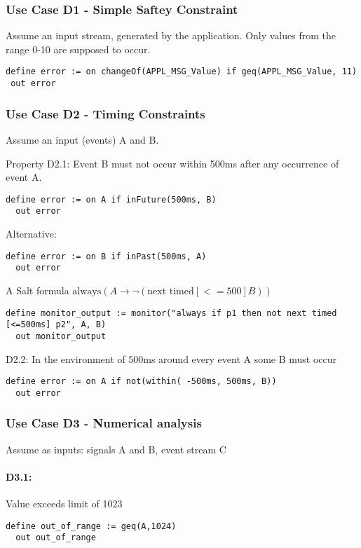 \subsubsection{Use Case D1 - Simple Saftey Constraint}

Assume an input stream, generated by the application. 
Only values from the range 0-10 are supposed to occur.

\begin{lstlisting}[language=tessla+salt]
 define error := on changeOf(APPL_MSG_Value) if geq(APPL_MSG_Value, 11)
 out error
\end{lstlisting}

\subsubsection{Use Case D2 - Timing Constraints}

Assume an input (events) A and B.

Property D2.1: Event B must not occur within 500ms after any occurrence of event A.
\begin{lstlisting}[language=tessla+salt]
  define error := on A if inFuture(500ms, B)
  out error
\end{lstlisting}

Alternative:
\begin{lstlisting}[language=tessla+salt]
  define error := on B if inPast(500ms, A)
  out error
\end{lstlisting}


A Salt formula $\text{always} (A → ¬(\text{next timed}[<=500] B))$
\begin{lstlisting}[language=tessla+salt]
  define monitor_output := monitor("always if p1 then not next timed [<=500ms] p2", A, B)
  out monitor_output
\end{lstlisting}

D2.2: In the environment of 500ms around every event A some B must occur
\begin{lstlisting}[language=tessla+salt]
  define error := on A if not(within( -500ms, 500ms, B))
  out error
\end{lstlisting}

\subsubsection{Use Case D3 - Numerical analysis}

Assume as inputs: signals A and B, event stream C

\paragraph{D3.1:} Value exceeds limit of 1023
\begin{lstlisting}[language=tessla+salt]
  define out_of_range := geq(A,1024)
  out out_of_range
\end{lstlisting}

